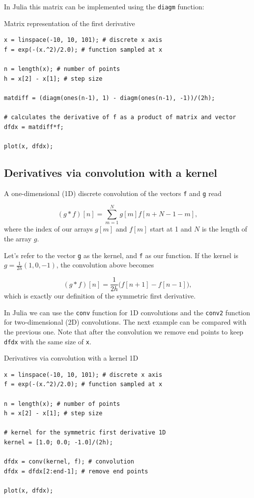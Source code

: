 In Julia this matrix can be implemented using the \texttt{diagm} function:

\begin{example}{Matrix representation of the first derivative}
\label{ex:matrix}
\begin{verbatim}
x = linspace(-10, 10, 101); # discrete x axis
f = exp(-(x.^2)/2.0); # function sampled at x

n = length(x); # number of points
h = x[2] - x[1]; # step size

matdiff = (diagm(ones(n-1), 1) - diagm(ones(n-1), -1))/(2h);

# calculates the derivative of f as a product of matrix and vector
dfdx = matdiff*f; 

plot(x, dfdx);
\end{verbatim}
\end{example}

\subsection{Derivatives via convolution with a kernel}

A one-dimensional (1D) discrete convolution of the vectors \texttt{f} and \texttt{g} read

\begin{equation}
 (g \ast f)[n] = \sum_{m=1}^N g[m]f[n+N-1-m],
\end{equation}
where the index of our arrays $g[m]$ and $f[m]$ start at 1 and $N$ is the length of the array $g$.



Let's refer to the vector \texttt{g} as the kernel, and \texttt{f} as our function. If the kernel is \mbox{$g = \frac{1}{2h}(1, 0, -1)$}, the convolution above becomes

\begin{equation}
 (g \ast f)[n] = \dfrac{1}{2h}\Big(f[n+1] - f[n-1]\Big),
\end{equation}
which is exactly our definition of the symmetric first derivative. 

In Julia we can use the \texttt{conv} function for 1D convolutions and the \texttt{conv2} function for two-dimensional (2D) convolutions. The next example can be compared with the previous one. Note that after the convolution we remove end points to keep \texttt{dfdx} with the same size of \texttt{x}.

\begin{example}{Derivatives via convolution with a kernel 1D}
\label{ex:conv}
\begin{verbatim}
x = linspace(-10, 10, 101); # discrete x axis
f = exp(-(x.^2)/2.0); # function sampled at x

n = length(x); # number of points
h = x[2] - x[1]; # step size

# kernel for the symmetric first derivative 1D
kernel = [1.0; 0.0; -1.0]/(2h);

dfdx = conv(kernel, f); # convolution
dfdx = dfdx[2:end-1]; # remove end points

plot(x, dfdx);
\end{verbatim}
\end{example}

